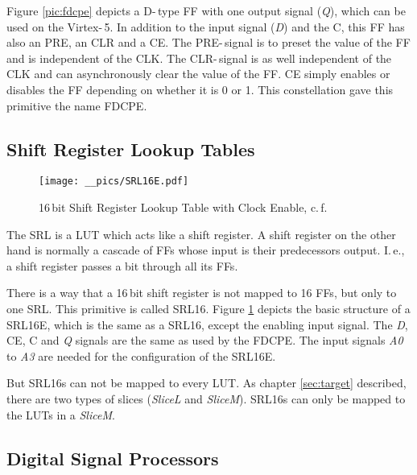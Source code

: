 Figure \ref{pic:fdcpe} depicts a D-\,type \ac{FF} with one output signal (\textit{Q}), which can be used on the Virtex-\,5. In addition to the input signal (\textit{D}) and the \ac{C}, this \ac{FF} has also an \ac{PRE}, an \ac{CLR} and a \ac{CE}. The \ac{PRE}-\,signal is to preset the value of the \ac{FF} and is independent of the \ac{CLK}. The \ac{CLR}-\,signal is as well independent of the \ac{CLK} and can asynchronously clear the value of the \ac{FF}. \ac{CE} simply enables or disables the \ac{FF} depending on whether it is 0 or 1.  This constellation gave this primitive the name  \ac{FDCPE}.



\subsection{Shift Register Lookup Tables}

	\begin{figure}[h]
		\center
		\texttt{[image: \_\_pics/SRL16E.pdf]}
		\caption{16\,bit Shift Register Lookup Table with Clock Enable, c.\,f. \cite{Xilinx2010c}}
		\label{pic:srl16e}	
	\end{figure}

The \ac{SRL} is a \ac{LUT} which acts like a shift register. A shift register on the other hand is normally a cascade of \acp{FF} whose input is their predecessors output. I.\,e., a shift register passes a bit through all its \acp{FF}.

There is a way that a 16\,bit shift register is not mapped to 16 \acp{FF}, but only to one \ac{SRL}. This primitive is called \ac{SRL16}. Figure \ref{pic:srl16e} depicts the basic structure of a \ac{SRL16E}, which is the same as a \ac{SRL16}, except the enabling input signal. The \textit{D}, \ac{CE}, \ac{C} and \textit{Q} signals are the same as used by the \ac{FDCPE}. The input signals \textit{A0} to \textit{A3} are needed for the configuration of the \ac{SRL16E}.

But \acp{SRL16} can not be mapped to every \ac{LUT}. As chapter \ref{sec:target} described, there are two types of slices (\textit{SliceL} and \textit{SliceM}). \acp{SRL16} can only be mapped to the \acp{LUT} in a \textit{SliceM}.


\subsection{Digital Signal Processors}

